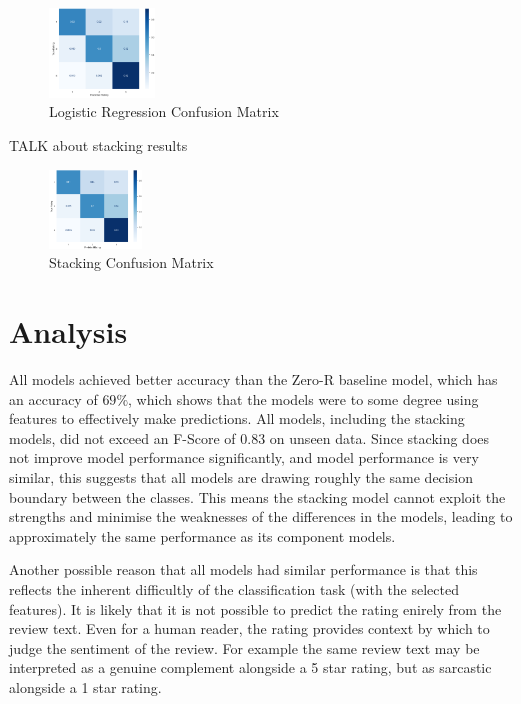\documentclass[11pt]{article}
\newcommand{\drafting}[1]{\textcolor{OliveGreen}{#1}}
\begin{document}
\begin{figure}
	\centering
	\includegraphics[width = 0.25\textwidth]{fig-lr-cm.png}
	\caption{Logistic Regression Confusion Matrix}
	\label{fig:lr-cm}
\end{figure}


\drafting{TALK about stacking results}
\begin{figure}
	\centering
	\includegraphics[width = 0.22\textwidth]{fig-stack-cm.png}
	\caption{Stacking Confusion Matrix}
	\label{fig:stack-cm}
\end{figure}

\section{Analysis}
All models achieved better accuracy than the Zero-R baseline model, which has an accuracy of $69 \%$, which shows that the models were to some degree using features to effectively make predictions. All models, including the stacking models, did not exceed an F-Score of 0.83 on unseen data. Since stacking does not improve model performance significantly, and model performance is very similar, this suggests that all models are drawing roughly the same decision boundary between the classes. This means the stacking model cannot exploit the strengths and minimise the weaknesses of the differences in the models, leading to approximately the same performance as its component models. 

Another possible reason that all models had similar performance is that this reflects the inherent difficultly of the classification task (with the selected features). It is likely that it is not possible to predict the rating enirely from the review text. Even for a human reader, the rating provides context by which to judge the sentiment of the review. For example the same review text may be interpreted as a genuine complement alongside a 5 star rating, but as sarcastic alongside a 1 star rating.
\end{document}
